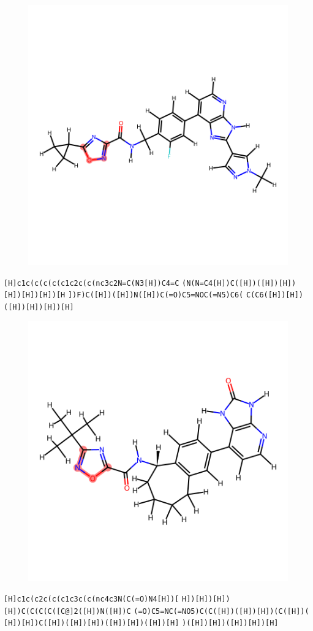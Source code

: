\documentclass{article}
\begin{document}
\begin{figure}[ht]
\centering
    \includegraphics{mol270.png}
\end{figure}
\verb|[H]c1c(c(c(c(c1c2c(c(nc3c2N=C(N3[H])C4=C| \verb|(N(N=C4[H])C([H])([H])[H])[H])[H])[H])[H| \verb|])F)C([H])([H])N([H])C(=O)C5=NOC(=N5)C6(| \verb|C(C6([H])[H])([H])[H])[H])[H]|

\begin{figure}[ht]
\centering
    \includegraphics{mol271.png}
\end{figure}
\verb|[H]c1c(c2c(c(c1c3c(c(nc4c3N(C(=O)N4[H])[| \verb|H])[H])[H])[H])C(C(C(C([C@]2([H])N([H])C| \verb|(=O)C5=NC(=NO5)C(C([H])([H])[H])(C([H])(| \verb|[H])[H])C([H])([H])[H])([H])[H])([H])[H]| \verb|)([H])[H])([H])[H])[H]|
\end{document}
